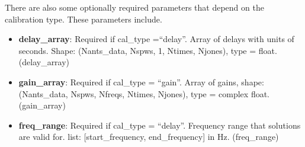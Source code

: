 \documentclass[11pt, oneside, english]{article}   	%
\begin{document}
\begin{itemize}
\end{itemize}

There are also some optionally required parameters that depend on the
calibration type. These parameters include.
\begin{itemize}
\item{\textbf{delay\_array}: Required if cal\_type =``delay''. Array of delays with
    units of seconds. Shape: (Nants\_data, Nspws, 1, Ntimes, Njones), type = float. (delay\_array)}
\item{\textbf{gain\_array}: Required if cal\_type = ``gain''. Array of gains, 
    shape: (Nants\_data, Nspws, Nfreqs, Ntimes, Njones), type = complex float. (gain\_array)}
\item{\textbf{freq\_range}: Required if cal\_type = ``delay''. Frequency range that
   solutions are valid for. list: [start\_frequency, end\_frequency] in Hz. (freq\_range)}
\end{itemize}
\end{document}
